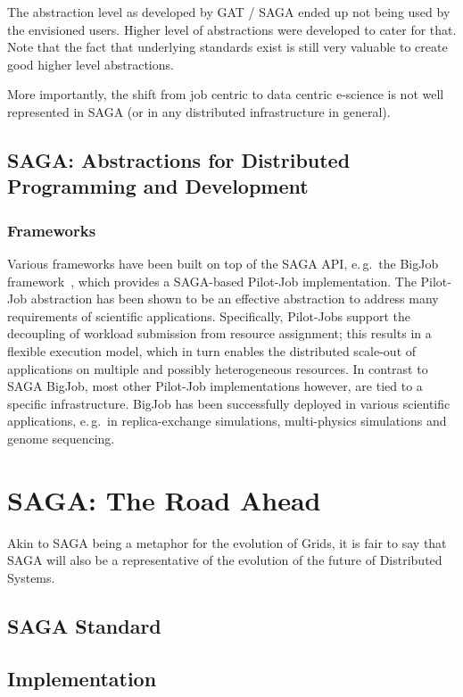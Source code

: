 \documentclass{article}
\begin{document}
The abstraction level as developed by GAT / SAGA ended up not being used by the envisioned users.
Higher level of abstractions were developed to cater for that. Note that the fact that underlying standards exist is still very valuable to create good higher level abstractions.

More importantly, the shift from job centric to data centric e-science is not well represented in SAGA (or in any distributed infrastructure in general).

\subsection{SAGA: Abstractions for Distributed Programming and
  Development}

\subsubsection{Frameworks}

Various frameworks have been built on top of the SAGA API, e.\,g.\ the BigJob
framework~\cite{saga_bigjob_condor_cloud}, which provides a SAGA-based
Pilot-Job implementation. The Pilot-Job abstraction has been shown to be an
effective abstraction to address many requirements of scientific applications.
Specifically, Pilot-Jobs support the decoupling of workload submission from
resource assignment; this results in a flexible execution model, which in turn
enables the distributed scale-out of applications on multiple and possibly
heterogeneous resources. In contrast to SAGA BigJob, most other Pilot-Job
implementations however, are tied to a specific infrastructure. BigJob has 
been successfully deployed in various scientific applications, e.\,g.\ in 
replica-exchange simulations, multi-physics simulations and genome sequencing.


\section{SAGA: The Road Ahead}

Akin to SAGA being a metaphor for the evolution of Grids, it is fair
to say that SAGA will also be a representative of the evolution of the
future of Distributed Systems.

\subsection{SAGA Standard}
\subsection{Implementation}
\end{document}
